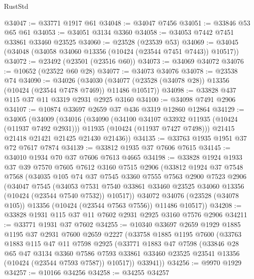 \begin{lexlean}{RustStd}
\begin{coremodule}
@34047 := @33771 @1917 @61
@34048 := @34047 @7456
@34051 := @33846 @53 @65 @61
@34053 := @34051 @3134 @3360
@34058 := @34053 @7442 @7451 @33861 @33460 @23525
@34060 := @23528 (@23539 @53)
@34069 := @34045 (@34048 (@34058 @34060 @13356 (@10424 (@23544 @7451 @7443)) @10517))
@34072 := @23492 (@23501 (@23516 @60))
@34073 := @34069 @34072
@34076 := @10652 (@23522 @60 @28)
@34077 := @34073 @34076
@34078 := @23538 @74
@34090 := @34026
    (@34030 (@34077 (@23528 (@34078 @28)) @13356 (@10424 (@23544 @7478 @7469)) @11486 @10517))
@34098 := @33828 @437 @115 @37 @11 @3319 @2931 @2925 @3160
@34100 := @34098 @7491 @2906
@34107 := @10874 @33697 @2659 @37 @436 @3319 @12860 @12864
@34129 := @34005
    (@34009
      (@34016
        (@34090
          (@34100 @34107 @33932 @11935 (@10424 (@11937 @7492 @2931)))
          @11935
          (@10424 (@11937 @7427 @7498)))
        @21415
        @21418
        @21421
        @21425
        @21430
        @21436))
@34135 := @33763 @1935 @1951 @37 @72 @7617 @7874
@34139 := @33812 @1935 @37 @7606 @7615
@34145 := @34010 @1934 @70 @37 @7606 @7613 @4665
@34198 := @33828
    @1924
    @1933
    @37
    @39
    @7570
    @7605
    @7612
    @3160
    @7515
    @2906
    (@33812
      @1924
      @37
      @7548
      @7568
      (@34035
        @105
        @74
        @37
        @7545
        @3360
        @7555
        @7563
        @2900
        @7523
        @2906
        (@34047
          @7545
          (@34053
            @7531
            @7540
            @33861
            @33460
            @23525
            @34060
            @13356
            (@10424 (@23544 @7540 @7532))
            @10517))
        @34072
        @34076
        (@23528 (@34078 @105))
        @13356
        (@10424 (@23544 @7563 @7556))
        @11486
        @10517))
@34208 := @33828 @1931 @115 @37 @11 @7602 @2931 @2925 @3160 @7576 @2906
@34211 := @33771 @1931 @37 @7602
@34255 := @10340
    @33697
    @2659
    @1929
    @1885
    @1195
    @37
    @2931
    @7600
    @2659
    @2227
    (@33758
      @1885
      @1195
      @7600
      (@33763
        @1883
        @115
        @47
        @11
        @7598
        @2925
        (@33771
          @1883
          @47
          @7598
          (@33846
            @28
            @65
            @47
            @3134
            @3360
            @7586
            @7593
            @33861
            @33460
            @23525
            @23541
            @13356
            (@10424 (@23544 @7593 @7587))
            @10517))
        @33941))
@34256 := @9970 @1929
@34257 := @10166 @34256
@34258 := @34255 @34257

\end{coremodule}
\end{lexlean}
